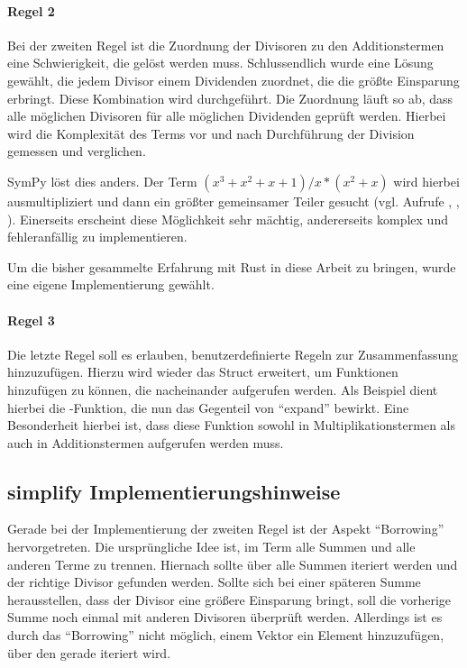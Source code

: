 \documentclass[11pt,a4paper, ngerman]{article}
\begin{document}
\paragraph{Regel 2} Bei der zweiten Regel ist die Zuordnung der Divisoren zu den Additionstermen eine Schwierigkeit, die gelöst werden muss. Schlussendlich wurde eine Lösung gewählt, die jedem Divisor einem Dividenden zuordnet, die die größte Einsparung erbringt. Diese Kombination wird durchgeführt. Die Zuordnung läuft so ab, dass alle möglichen Divisoren für alle möglichen Dividenden geprüft werden. Hierbei wird die Komplexität des Terms vor und nach Durchführung der Division gemessen und verglichen.

SymPy löst dies anders. Der Term $(x^3+x^2+x+1)/x*(x^2+x)$ wird hierbei ausmultipliziert und dann ein größter gemeinsamer Teiler gesucht (vgl. \cite{SymPySimplifySrc} Aufrufe , , ). Einerseits erscheint diese Möglichkeit sehr mächtig, andererseits komplex und fehleranfällig zu implementieren.

\label{sec:Regel2Simp}
Um die bisher gesammelte Erfahrung mit Rust in diese Arbeit zu bringen, wurde eine eigene Implementierung gewählt.

\paragraph{Regel 3} Die letzte Regel soll es erlauben, benutzerdefinierte Regeln zur Zusammenfassung hinzuzufügen. Hierzu wird wieder das Struct  erweitert, um Funktionen hinzufügen zu können, die nacheinander aufgerufen werden. Als Beispiel dient hierbei die -Funktion, die nun das Gegenteil von ``expand'' bewirkt. Eine Besonderheit hierbei ist, dass diese Funktion sowohl in Multiplikationstermen als auch in Additionstermen aufgerufen werden muss.

\subsection{simplify Implementierungshinweise}
Gerade bei der Implementierung der zweiten Regel ist der Aspekt ``Borrowing'' hervorgetreten. Die ursprüngliche Idee ist, im Term alle Summen und alle anderen Terme zu trennen. Hiernach sollte über alle Summen iteriert werden und der richtige Divisor gefunden werden. Sollte sich bei einer späteren Summe herausstellen, dass der Divisor eine größere Einsparung bringt, soll die vorherige Summe noch einmal mit anderen Divisoren überprüft werden. Allerdings ist es durch das ``Borrowing'' nicht möglich, einem Vektor ein Element hinzuzufügen, über den gerade iteriert wird.
\end{document}
